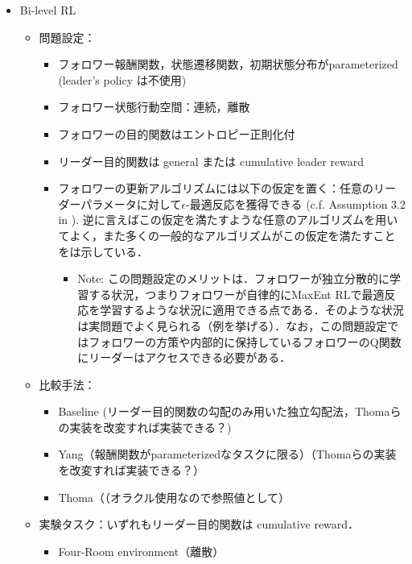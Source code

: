 \documentclass[a4paper,10pt,dvipdfmx]{jsarticle}
\begin{document}
\begin{itemize}
    \item Bi-level RL
    \begin{itemize}
        \item 問題設定：
        \begin{itemize}
            \item フォロワー報酬関数，状態遷移関数，初期状態分布がparameterized (leader's policy は不使用)
            \item フォロワー状態行動空間：連続，離散
            \item フォロワーの目的関数はエントロピー正則化付
            \item リーダー目的関数は general または cumulative leader reward
            \item フォロワーの更新アルゴリズムには以下の仮定を置く：任意のリーダーパラメータに対して$\epsilon$-最適反応を獲得できる (c.f. Assumption 3.2 in \cite{Thoma2024-em}). 逆に言えばこの仮定を満たすような任意のアルゴリズムを用いてよく，また多くの一般的なアルゴリズムがこの仮定を満たすことを\cite{Thoma2024-em}は示している．
            \begin{itemize}
                \item Note: この問題設定のメリットは．フォロワーが独立分散的に学習する状況，つまりフォロワーが自律的にMaxEnt RLで最適反応を学習するような状況に適用できる点である．そのような状況は実問題でよく見られる（例を挙げる）．なお，この問題設定ではフォロワーの方策や内部的に保持しているフォロワーのQ関数にリーダーはアクセスできる必要がある．
            \end{itemize}
        \end{itemize}
        \item 比較手法：
        \begin{itemize}
            \item Baseline (リーダー目的関数の勾配のみ用いた独立勾配法，Thomaらの実装を改変すれば実装できる？)
            \item Yang\cite{Yang2024-hp}（報酬関数がparameterizedなタスクに限る）（Thomaらの実装を改変すれば実装できる？）
            \item Thoma\cite{Thoma2024-em}（（オラクル使用なので参照値として）
        \end{itemize}
        \item 実験タスク：いずれもリーダー目的関数は cumulative reward．
        \begin{itemize}
            \item Four-Room environment\cite{Thoma2024-em}（離散） 

\end{itemize}
\end{itemize}
\end{itemize}
\end{document}
